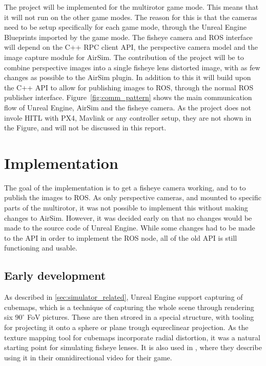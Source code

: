 The project will be implemented for the multirotor game mode. This means that it will not run on the other game modes. The reason for this is that the cameras need to be setup specifically for each game mode, through the Unreal Engine Blueprints imported by the game mode. The fisheye camera and ROS interface will depend on the C++ RPC client API, the perspective camera model and the image capture module for AirSim. The contribution of the project will be to combine perspective images into a single fisheye lens distorted image, with as few changes as possible to the AirSim plugin. In addition to this it will build upon the C++ API to allow for publishing images to ROS, through the normal ROS publisher interface. Figure~\ref{fig:comm_pattern} shows the main communication flow of Unreal Engine, AirSim and the fisheye camera. As the project does not invole HITL with PX4, Mavlink or any controller setup, they are not shown in the Figure, and will not be discussed in this report.

\section{Implementation}

The goal of the implementation is to get a fisheye camera working, and to to publish the images to ROS. As only perspective cameras, and mounted to specific parts of the multirotor, it was not possible to implement this without making changes to AirSim. However, it was decided early on that no changes would be made to the source code of Unreal Engine. While some changes had to be made to the API in order to implement the ROS node, all of the old API is still functioning and usable.

\subsection{Early development} \label{sec:Early_dev}

As described in \ref{sec:simulator_related}, Unreal Engine support capturing of cubemaps, which is a technique of capturing the whole scene through rendering six $90^\circ$ FoV pictures. These are then strored in a special structure, with tooling for projecting it onto a sphere or plane trough equreclinear projection. As the texture mapping tool for cubemaps incorporate radial distortion, it was a natural starting point for simulating fisheye lenses. It is also used in \cite{UnrealCubeCapture}, where they describe using it in their omnidirectional video for their game.

